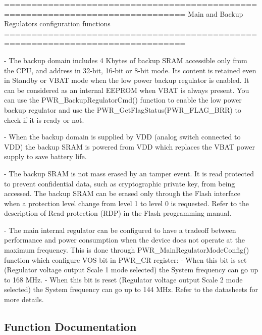 \begin{DoxyVerb} ===============================================================================
                    Main and Backup Regulators configuration functions
 ===============================================================================  

 - The backup domain includes 4 Kbytes of backup SRAM accessible only from the 
   CPU, and address in 32-bit, 16-bit or 8-bit mode. Its content is retained 
   even in Standby or VBAT mode when the low power backup regulator is enabled. 
   It can be considered as an internal EEPROM when VBAT is always present.
   You can use the PWR_BackupRegulatorCmd() function to enable the low power
   backup regulator and use the PWR_GetFlagStatus(PWR_FLAG_BRR) to check if it is
   ready or not. 

 - When the backup domain is supplied by VDD (analog switch connected to VDD) 
   the backup SRAM is powered from VDD which replaces the VBAT power supply to 
   save battery life.

 - The backup SRAM is not mass erased by an tamper event. It is read protected 
   to prevent confidential data, such as cryptographic private key, from being 
   accessed. The backup SRAM can be erased only through the Flash interface when
   a protection level change from level 1 to level 0 is requested. 
   Refer to the description of Read protection (RDP) in the Flash programming manual.

 - The main internal regulator can be configured to have a tradeoff between performance
   and power consumption when the device does not operate at the maximum frequency. 
   This is done through PWR_MainRegulatorModeConfig() function which configure VOS bit
   in PWR_CR register: 
      - When this bit is set (Regulator voltage output Scale 1 mode selected) the System
        frequency can go up to 168 MHz. 
      - When this bit is reset (Regulator voltage output Scale 2 mode selected) the System
        frequency can go up to 144 MHz. 
   Refer to the datasheets for more details.\end{DoxyVerb}
 

\subsection{Function Documentation}
\mbox{\label{group__PWR__Group4_ga83a4d6c5b048f2dab18e8fb04f5368d7}} 
